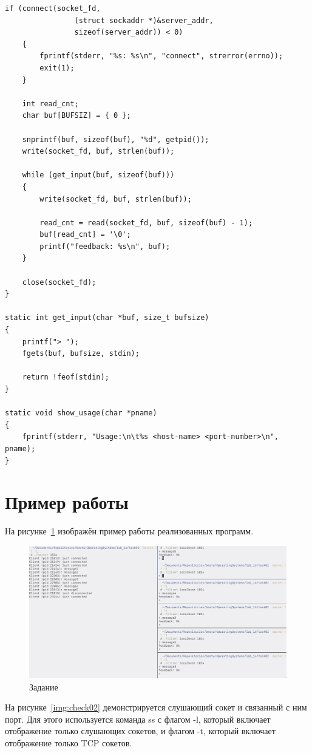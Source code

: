 \begin{lstlisting}[caption={Текст программы-клиента},label=lst:netclient]
    if (connect(socket_fd,
                (struct sockaddr *)&server_addr,
                sizeof(server_addr)) < 0)
    {
        fprintf(stderr, "%s: %s\n", "connect", strerror(errno));
        exit(1);
    }

    int read_cnt;
    char buf[BUFSIZ] = { 0 };

    snprintf(buf, sizeof(buf), "%d", getpid());
    write(socket_fd, buf, strlen(buf));

    while (get_input(buf, sizeof(buf)))
    {
        write(socket_fd, buf, strlen(buf));

        read_cnt = read(socket_fd, buf, sizeof(buf) - 1);
        buf[read_cnt] = '\0';
        printf("feedback: %s\n", buf);
    }

    close(socket_fd);
}

static int get_input(char *buf, size_t bufsize)
{
    printf("> ");
    fgets(buf, bufsize, stdin);

    return !feof(stdin);
}

static void show_usage(char *pname)
{
    fprintf(stderr, "Usage:\n\t%s <host-name> <port-number>\n", pname);
}
\end{lstlisting}

\section{Пример работы}

На рисунке~\ref{img:task02} изображён пример работы реализованных программ.

\begin{figure}[H]
    \centering
    \includegraphics[scale=0.235]{images/task02.png}
    \caption{Задание }\label{img:task02}
\end{figure}

На рисунке~\ref{img:check02} демонстрируется слушающий сокет и связанный с ним порт. Для этого используется команда ss с флагом -l, который включает отображение только слушающих сокетов, и флагом -t, который включает отображение только TCP сокетов.

